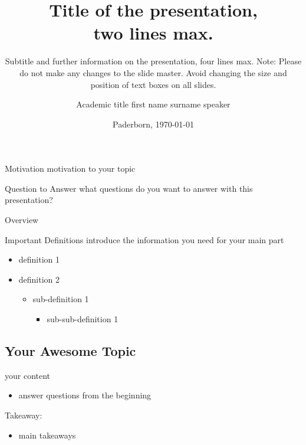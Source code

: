 \documentclass[
]{upbbeamer2023}
\title{Title of the presentation,\\two lines max.}
\subtitle{Subtitle and further information on the presentation, four lines max. Note: Please do not make any changes to the slide master. Avoid changing the size and position of text boxes on all slides.}
\institute{Research Group XYZ}
\author{Academic title first name surname speaker}
\date{Paderborn, \today}
\begin{document}
\begin{frame}[preface]{Motivation}
    motivation to your topic
\end{frame}

\begin{frame}[preface]{Question to Answer}
    what questions do you want to answer with this presentation?
\end{frame}

\begin{frame}[preface]{Overview}
    \tableofcontents
\end{frame}


\begin{frame}{Important Definitions}
    introduce the information you need for your main part

    \begin{itemize}
        \item definition 1
        \item definition 2
        \begin{itemize}
            \item sub-definition 1
            \begin{itemize}
                \item sub-sub-definition 1
            \end{itemize}
        \end{itemize}
    \end{itemize}
\end{frame}


\subsection{Your Awesome Topic}

\begin{frame}{\subsecname}
    your content
\end{frame}

\begin{frame}{\phantom{X}}

\end{frame}


\begin{frame}{\secname}
    \begin{itemize}
        \item answer questions from the beginning
    \end{itemize}
    \vspace*{1em}
    Takeaway:
    \begin{itemize}
        \item main takeaways
    \end{itemize}
\end{frame}
\end{document}
